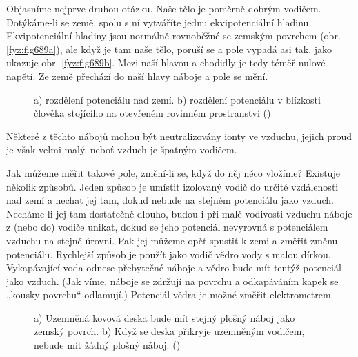     Objasníme nejprve druhou otázku. Naše tělo je poměrně dobrým vodičem. Dotýkáme-li se země, spolu
    s ní vytváříte jednu ekvipotenciální hladinu. Ekvipotenciální hladiny jsou normálně rovnoběžné
    se zemským povrchem (obr. \ref{fyz:fig689a}), ale když je tam naše tělo, poruší se a pole vypadá
    asi tak, jako ukazuje obr. \ref{fyz:fig689b}. Mezi naší hlavou a chodidly je tedy téměř nulové
    napětí. Ze země přechází do naší hlavy náboje a pole se mění.

    \begin{figure}[ht!]
      \centering
                     \newline
      \caption{a) rozdělení potenciálu nad zemí. b) rozdělení potenciálu v blízkosti člověka 
               stojícího na otevřeném rovinném prostranství (\cite[s.~748]{Feynman02})}
      \label{fyz:fig689}
    \end{figure}

    Některé z těchto nábojů mohou být neutralizovány ionty ve vzduchu, jejich proud je však velmi
    malý, neboť vzduch je špatným vodičem.

    Jak můžeme měřit takové pole, změní-li se, když do něj něco vložíme? Existuje několik způsobů.
    Jeden způsob je umístit izolovaný vodič do určité vzdálenosti nad zemí a nechat jej tam, dokud
    nebude na stejném potenciálu jako vzduch. Necháme-li jej tam dostatečně dlouho, budou i při malé
    vodivosti vzduchu náboje z (nebo do) vodiče unikat, dokud se jeho potenciál nevyrovná s
    potenciálem vzduchu na stejné úrovni. Pak jej můžeme opět spustit k zemi a změřit změnu
    potenciálu. Rychlejší způsob je použít jako vodič vědro vody s malou dírkou. Vykapávající voda
    odnese přebytečné náboje a vědro bude mít tentýž potenciál jako vzduch. (Jak víme, náboje se
    zdržují na povrchu a odkapáváním kapek se „kousky povrchu“ odlamují.) Potenciál vědra je možné
    změřit elektrometrem.

    \begin{figure}[ht!]
      \centering
                     \newline
      \caption{a) Uzemněná kovová deska bude mít stejný plošný náboj jako zemský povrch.
               b) Když se deska přikryje uzemněným vodičem, nebude mít žádný plošný náboj.
               (\cite[s.~707]{Feynman02})}
      \label{fyz:fig690}
    \end{figure}

